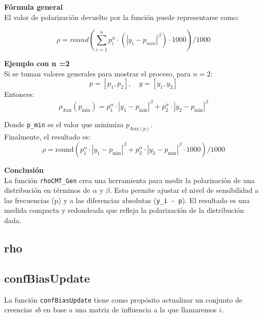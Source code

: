 \documentclass{article}
\begin{document}
	\textbf{Fórmula general}\\
	El valor de polarización devuelto por la función puede representarse como:
	
	\[
	\rho = round (\sum_{i=1}^n p_i^\alpha \cdot ( |y_i - p_{min}|^\beta) \cdot 1000) /1000
	\]  

	\textbf{Ejemplo con n =2}\\
	
	Si se toman valores generales para mostrar el proceso, para $n = 2$:  
	\[
	p = [p_1, p_2], \quad y = [y_1, y_2]
	\]  
	Entonces:  
	\[
	\rho_{\text{Aux}}(p_{\text{min}}) = p_1^\alpha \cdot |y_1 - p_{\text{min}}|^\beta + p_2^\alpha \cdot |y_2 - p_{\text{min}}|^\beta
	\]  
	
	Donde \texttt{p\_min} es el valor que minimiza $p_{\text{Aux}(p)}$. \\
	Finalmente, el resultado es:
	\[
	\rho = \text{round}\left(p_1^\alpha \cdot |y_1 - p_{\text{min}}|^\beta + p_2^\alpha \cdot |y_2 - p_{\text{min}}|^\beta \cdot 1000\right) / 1000
	\]  
	
	\textbf{Conclusión}\\

	La función \texttt{rhoCMT\_Gen} crea una herramienta para medir la polarización de una distribución en términos de $\alpha$ y $\beta$. Esto permite ajustar el nivel de sensibilidad a las frecuencias (p) y a las diferencias absolutas (\texttt{y\_i - p}). El resultado es una medida compacta y redondeada que refleja la polarización de la distribución dada.


    \subsection{rho}

\subsection{confBiasUpdate}
	
	La función \texttt{confBiasUpdate} tiene como propósito actualizar un conjunto de creencias $sb$ en base a una matriz de influencia a la que llamaremos $i$.
  \\
\end{document}
